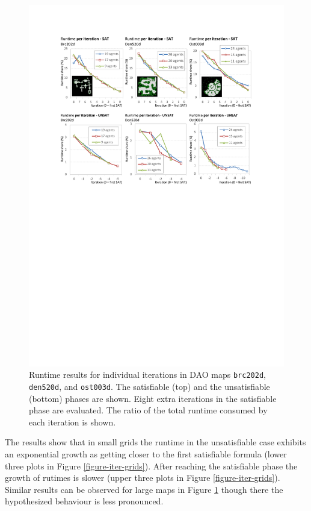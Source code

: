 \documentclass[jair,oneside,11pt]{article}
\begin{document}
\begin{figure}[h]
\centering
\includegraphics[trim={2.5cm 15.0cm 2.5cm 2.6cm},clip,width=1.0\textwidth]{exprMI_iter_maps.pdf}
\vspace{-0.6cm}\caption{Runtime results for individual iterations in DAO maps \texttt{brc202d},  \texttt{den520d}, and \texttt{ost003d}. The satisfiable (top) and the unsatisfiable (bottom) phases are shown. Eight extra iterations in the satisfiable phase are evaluated. The ratio of the total runtime consumed by each iteration is shown.}
\label{figure-iter-maps}
\end{figure}

The results show that in small grids the runtime in the unsatisfiable case exhibits an exponential growth as getting closer to the first satisfiable formula (lower three plots in Figure \ref{figure-iter-grids}). After reaching the satisfiable phase the growth of rutimes is slower (upper three plots in Figure \ref{figure-iter-grids}). Similar results can be observed for large maps in Figure \ref{figure-iter-maps} though there the hypothesized behaviour is less pronounced.
\end{document}
